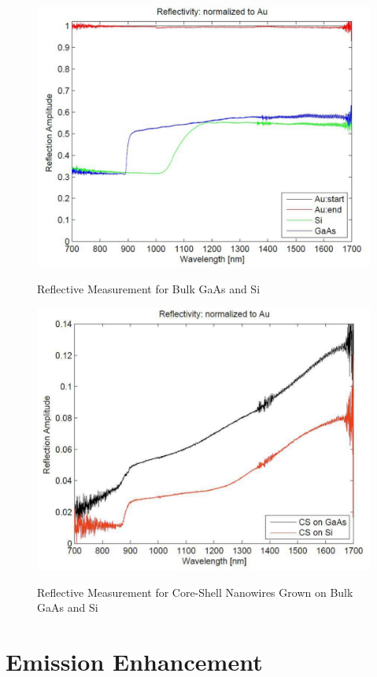 \begin{figure}
  \caption{Reflective Measurement for Bulk GaAs and Si}
  \centering
  \includegraphics[width=\textwidth]{pictures/Data/reflecbulk}
  \label{reflecbulk}
\end{figure}

\begin{figure}
  \caption{Reflective Measurement for Core-Shell Nanowires Grown on Bulk GaAs and Si}
  \centering
  \includegraphics[width=\textwidth]{pictures/Data/reflectCSNW}
  \label{reflectCSNW}
\end{figure}

\section{Emission Enhancement} \label{Dust_data}

